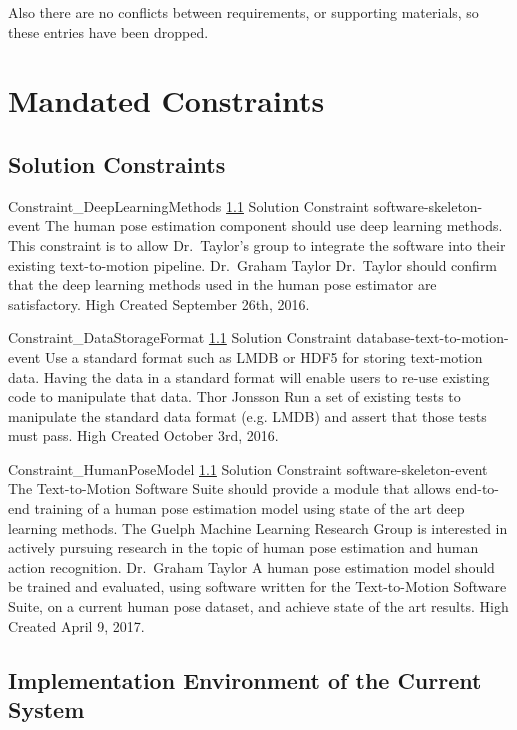 \documentclass{scrreprt}
\begin{document}
Also there are no conflicts between requirements, or supporting materials, so
these entries have been dropped.

\section{Mandated Constraints}

\subsection{Solution Constraints}
\label{req-solution-constraint}

\requirement
{Constraint_DeepLearningMethods}
{\ref{req-solution-constraint} Solution Constraint}
{software-skeleton-event}
{The human pose estimation component should use deep learning methods.}
{This constraint is to allow Dr.\ Taylor's group to integrate the software into
 their existing text-to-motion pipeline.}
{Dr.\ Graham Taylor}
{Dr.\ Taylor should confirm that the deep learning methods used in the human
 pose estimator are satisfactory.}
{High}
{Created September 26th, 2016.}

\requirement
{Constraint_DataStorageFormat}
{\ref{req-solution-constraint} Solution Constraint}
{database-text-to-motion-event}
{Use a standard format such as LMDB or HDF5 for storing text-motion data.}
{Having the data in a standard format will enable users to re-use existing code
 to manipulate that data.}
{Thor Jonsson }
{Run a set of existing tests to manipulate the standard data format (e.g. LMDB)
 and assert that those tests must pass.}
{High}
{Created October 3rd, 2016.}

\requirement
{Constraint_HumanPoseModel}
{\ref{req-solution-constraint} Solution Constraint}
{software-skeleton-event}
{The Text-to-Motion Software Suite should provide a module that allows
 end-to-end training of a human pose estimation model using state of the art
 deep learning methods.}
{The Guelph Machine Learning Research Group is interested in actively pursuing
 research in the topic of human pose estimation and human action recognition.}
{Dr.\ Graham Taylor}
{A human pose estimation model should be trained and evaluated, using software
 written for the Text-to-Motion Software Suite, on a current human pose dataset,
 and achieve state of the art results.}
{High}
{Created April 9, 2017.}

\subsection{Implementation Environment of the Current System}
\label{req-implementation-environment}
\end{document}
